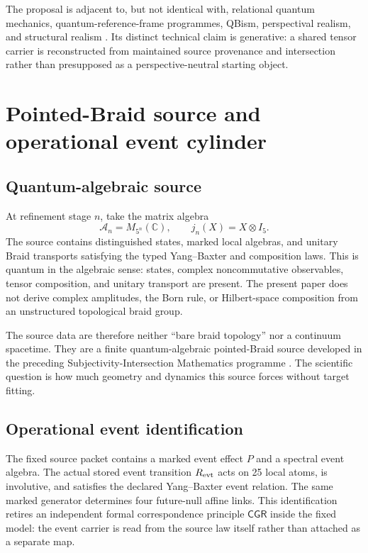 \documentclass[11pt]{article}
\theoremstyle{definition}
\theoremstyle{remark}
\newcommand{\cA}{\mathcal{A}}
\newcommand{\CGR}{\mathsf{CGR}}
\begin{document}
The proposal is adjacent to, but not identical with, relational quantum mechanics, quantum-reference-frame programmes, QBism, perspectival realism, and structural realism \cite{rovelli1996,giacomini2019,vanrietvelde2020,fuchs2013,massimi2022,ladyman1998,weyl1952}. Its distinct technical claim is generative: a shared tensor carrier is reconstructed from maintained source provenance and intersection rather than presupposed as a perspective-neutral starting object.

\section{Pointed-Braid source and operational event cylinder}

\subsection{Quantum-algebraic source}

At refinement stage $n$, take the matrix algebra
\begin{equation}
 \cA_n=M_{5^n}(\mathbb C),\qquad
 j_n(X)=X\otimes I_5.
\end{equation}
The source contains distinguished states, marked local algebras, and unitary Braid transports satisfying the typed Yang--Baxter and composition laws. This is quantum in the algebraic sense: states, complex noncommutative observables, tensor composition, and unitary transport are present. The present paper does not derive complex amplitudes, the Born rule, or Hilbert-space composition from an unstructured topological braid group.

The source data are therefore neither ``bare braid topology'' \cite{artin1947} nor a continuum spacetime. They are a finite quantum-algebraic pointed-Braid source developed in the preceding Subjectivity-Intersection Mathematics programme \cite{watanabe2026braid,watanabe2026ontology}. The scientific question is how much geometry and dynamics this source forces without target fitting.

\subsection{Operational event identification}

The fixed source packet contains a marked event effect $P$ and a spectral event algebra. The actual stored event transition $R_{\rm evt}$ acts on 25 local atoms, is involutive, and satisfies the declared Yang--Baxter event relation. The same marked generator determines four future-null affine links. This identification retires an independent formal correspondence principle $\CGR$ inside the fixed model: the event carrier is read from the source law itself rather than attached as a separate map.
\end{document}
